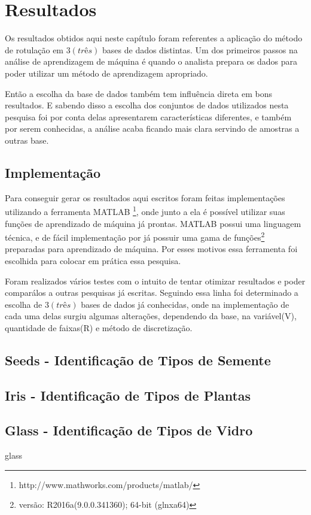 \chapter{Resultados}\label{cap:resultados}

Os resultados obtidos aqui neste capítulo foram referentes a aplicação do método de rotulação em ${3(três)}$ bases de dados distintas. Um dos primeiros passos na análise de aprendizagem de máquina é quando o analista prepara os dados para poder utilizar  um método de aprendizagem apropriado. 

Então  a escolha da base de dados também tem influência direta em bons resultados. E sabendo disso a escolha dos conjuntos de dados utilizados nesta pesquisa foi por conta delas apresentarem características diferentes, e também por serem conhecidas, a análise acaba ficando mais clara servindo de amostras a outras base.

\section{Implementação}

Para conseguir gerar os resultados aqui escritos foram feitas implementações utilizando a ferramenta MATLAB \footnote{http://www.mathworks.com/products/matlab/}, onde junto  a ela é possível utilizar suas funções de aprendizado de máquina já prontas. MATLAB possui uma linguagem técnica, e de fácil implementação por já possuir uma gama de funções\footnote{versão: R2016a(9.0.0.341360); 64-bit (glnxa64)} preparadas para aprendizado de máquina. Por esses motivos essa ferramenta foi escolhida para colocar em prática essa pesquisa.

Foram realizados vários testes com o intuito de tentar otimizar resultados e poder comparálos a outras pesquisas já escritas. Seguindo essa linha foi determinado a escolha de ${3(três)}$ bases de dados já conhecidas, onde na implementação de cada uma delas surgiu algumas alterações, dependendo da base, na variável(V), quantidade de faixas(R) e método de discretização. 

\section{Seeds - Identificação de Tipos de Semente}

\section{Iris - Identificação de Tipos de Plantas}

\section{Glass - Identificação de Tipos de Vidro}


glass

